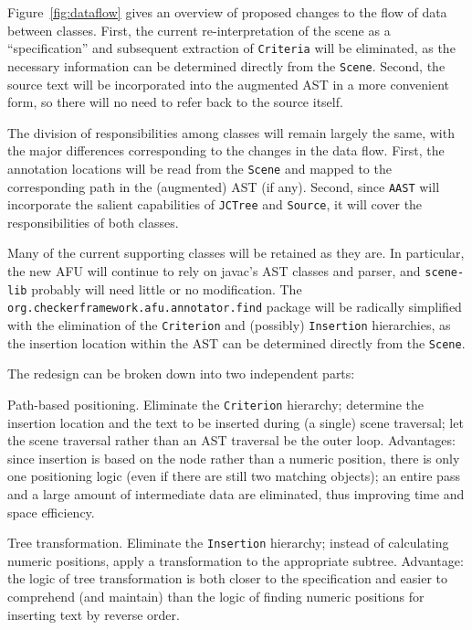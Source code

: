 \documentclass{article}
\begin{document}
Figure~\ref{fig:dataflow} gives an overview of proposed changes to the
flow of data between classes.  First, the current re-interpretation of
the scene as a ``specification'' and subsequent extraction of
\texttt{Criteria} will be eliminated, as the necessary information can
be determined directly from the \texttt{Scene}.  Second, the source text
will be incorporated into the augmented AST in a more convenient form,
so there will no need to refer back to the source itself.

The division of responsibilities among classes will remain largely the
same, with the major differences corresponding to the changes in the
data flow.  First, the annotation locations will be read from the
\texttt{Scene} and mapped to the corresponding path in the (augmented)
AST (if any).  Second, since \texttt{AAST} will incorporate the salient
capabilities of \texttt{JCTree} and \texttt{Source}, it will cover the
responsibilities of both classes.

Many of the current supporting classes will be retained as they are.  In
particular, the new AFU will continue to rely on javac's AST classes and
parser, and \texttt{scene-lib} probably will need little or no
modification.  The \texttt{org.checkerframework.afu.annotator.find} package will be radically
simplified with the elimination of the \texttt{Criterion} and
(possibly) \texttt{Insertion} hierarchies, as the insertion location
within the AST can be determined directly from the \texttt{Scene}.

The redesign can be broken down into two independent parts:
\begin{description}
\item{Path-based positioning.} Eliminate the \texttt{Criterion}
hierarchy; determine the insertion location and the text to be inserted
during (a single) scene traversal; let the scene traversal rather than
an AST traversal be the outer loop.  Advantages: since insertion is
based on the node rather than a numeric position, there is only one
positioning logic (even if there are still two matching objects); an
entire pass and a large amount of intermediate data are eliminated, thus
improving time and space efficiency.
\item{Tree transformation.}  Eliminate the \texttt{Insertion} hierarchy;
instead of calculating numeric positions, apply a transformation to the
appropriate subtree.  Advantage: the logic of tree transformation is
both closer to the specification and easier to comprehend (and maintain)
than the logic of finding numeric positions for inserting text by
reverse order.
\end{description}
\end{document}
